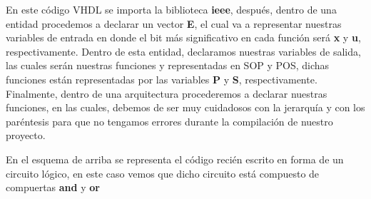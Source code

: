 \documentclass[letterpaper]{article} %
\begin{document}
                En este c\'odigo VHDL se importa la biblioteca \textbf{ieee}, despu\'es, dentro de una 
                entidad procedemos a declarar un vector \textbf{E}, el cual va a representar nuestras variables de entrada
                en donde el bit m\'as significativo en cada funci\'on ser\'a \textbf{x} y \textbf{u}, respectivamente.
                Dentro de esta entidad, declaramos nuestras variables de salida, las cuales ser\'an nuestras funciones y representadas
                en SOP y POS, dichas funciones est\'an representadas por las variables \textbf{P} y \textbf{S}, respectivamente. 
                Finalmente, dentro de una arquitectura procederemos a declarar nuestras funciones, en las cuales, debemos de ser muy 
                cuidadosos con la jerarqu\'ia y con los par\'entesis para que no tengamos errores durante la compilaci\'on de nuestro proyecto.

                \begin{figure}[H]
                    \raggedright
                \end{figure}

                En el esquema de arriba se representa el c\'odigo reci\'en escrito en forma de un
                circuito l\'ogico, en este caso vemos que dicho circuito est\'a compuesto de compuertas
                \textbf{and} y \textbf{or}

                \begin{figure}[H]
                    \raggedright
                \end{figure}
\end{document}
